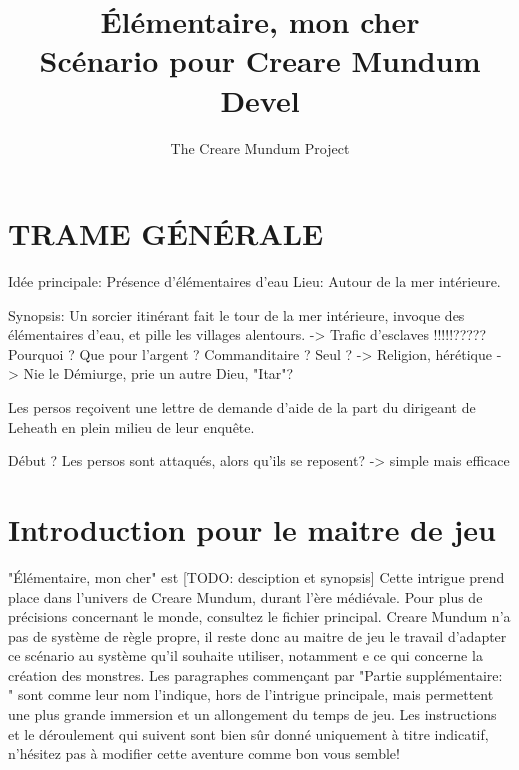 \documentclass[a4paper]{article}
\title{Élémentaire, mon cher\\ Scénario pour Creare Mundum \\ Devel}
\author{The Creare Mundum Project}
\date{\oldstylenums{\insertdate}}
\begin{document}
\maketitle
\setcounter{tocdepth}{1} %
\renewcommand{\contentsname}{Sommaire} 
\tableofcontents
\newpage

\section*{TRAME GÉNÉRALE}
Idée principale: Présence d'élémentaires d'eau
Lieu: Autour de la mer intérieure.

Synopsis: Un sorcier itinérant fait le tour de la mer intérieure, invoque des élémentaires d'eau, et pille les villages alentours. -> Trafic d'esclaves !!!!!?????
Pourquoi ? Que pour l'argent ? Commanditaire ? Seul ?
-> Religion, hérétique -> Nie le Démiurge, prie un autre Dieu, "Itar"?

Les persos reçoivent une lettre de demande d'aide de la part du dirigeant de Leheath en plein milieu de leur enquête.

Début ? Les persos sont attaqués, alors qu'ils se reposent? -> simple mais efficace


\section{Introduction pour le maitre de jeu}
"Élémentaire, mon cher" est [TODO: desciption et synopsis]
\newline
Cette intrigue prend place dans l'univers de Creare Mundum, durant l'ère médiévale. Pour plus de précisions concernant le monde, consultez le fichier principal.
\newline
Creare Mundum n'a pas de système de règle propre, il reste donc au maitre de jeu le travail d'adapter ce scénario au système qu'il souhaite utiliser, notamment e ce qui concerne la création des monstres.
\newline
Les paragraphes commençant par "Partie supplémentaire: " sont comme leur nom l'indique, hors de l'intrigue principale, mais permettent une plus grande immersion et un allongement du temps de jeu.
\newline
Les instructions et le déroulement qui suivent sont bien sûr donné uniquement à titre indicatif, n'hésitez pas à modifier cette aventure comme bon vous semble!
\end{document}
